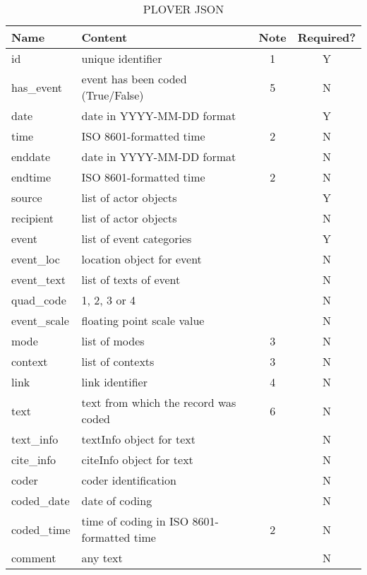 \documentclass[11pt]{report}
\begin{document}
\begin{table}[htp]
\caption{PLOVER JSON }
\begin{center}
\begin{tabular}{|l|l|c|c|}
\hline
Name & Content & Note & Required? \\
\hline
id & unique identifier & 1 & Y\\
has\_event & event has been coded (True/False) & 5 & N\\
date & date in YYYY-MM-DD format &  & Y\\
time & ISO 8601-formatted time & 2 & N\\
enddate & date in YYYY-MM-DD format &  & N\\
endtime & ISO 8601-formatted time & 2 & N\\
source & list of actor objects & & Y \\
recipient & list of actor objects & & N \\
event & list of event categories & & Y \\
event\_loc & location object for event & & N \\
event\_text & list of texts of event & & N \\
quad\_code & 1, 2, 3 or 4 & & N \\
event\_scale & floating point scale value & & N \\
mode & list of modes & 3 & N \\
context & list of contexts & 3 & N \\
link &  link identifier & 4 & N \\
text & text from which the record was coded & 6 & N \\
text\_info & textInfo object for text & & N \\
cite\_info & citeInfo object for text & & N \\
coder &  coder identification & & N \\
coded\_date & date of coding & & N \\
coded\_time & time of coding in ISO 8601-formatted time & 2 & N\\
comment &  any text & & N \\
\hline
\end{tabular}
\end{center}
\label{tab:json}
\end{table}
\end{document}
